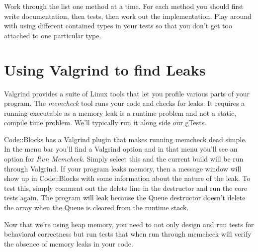 \documentclass[10pt]{article}
\begin{document}
Work through the list one method at a time. For each method you should first write documentation, then tests, then work out the implementation. Play around with using different contained types in your tests so that you don't get too attached to one particular type.

\section{Using Valgrind to find Leaks}

Valgrind provides a suite of Linux tools that let you profile various parts of your program. The \textit{memcheck} tool runs your code and checks for leaks. It requires a running executable as a memory leak is a runtime problem and not a static, compile time problem. We'll typically run it along side our gTests.

Code::Blocks has a Valgrind plugin that makes running memcheck dead simple. In the menu bar you'll find a Valgrind option and in that menu you'll see an option for \textit{Run Memcheck}. Simply select this and the current build will be run through Valgrind.  If your program leaks memory, then a message window will show up in Code::Blocks with some information about the nature of the leak. To test this, simply comment out the delete line in the destructor and run the core tests again.  The program will leak because the Queue destructor doesn't delete the array when the Queue is cleared from the runtime stack. 

Now that we're using heap memory, you need to not only design and run tests for behavioral correctness but run tests that when run through memcheck will verify the absence of memory leaks in your code.
\end{document}
